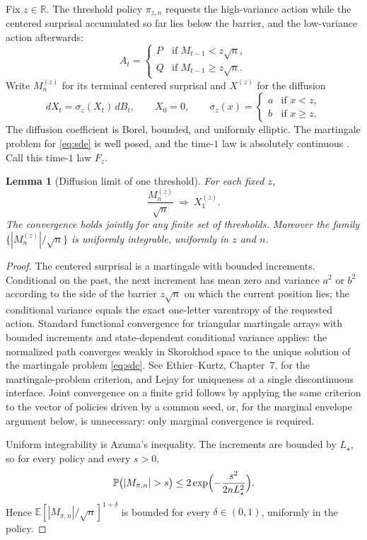 \documentclass[11pt]{article}
\newtheorem{lemma}[theorem]{Lemma}
\theoremstyle{definition}
\newcommand{\E}{\mathbb{E}}
\newcommand{\Prob}{\mathbb{P}}
\newcommand{\R}{\mathbb{R}}
\begin{document}
Fix \(z\in\R\).
The threshold policy \(\pi_{z,n}\) requests the high-variance action while the centered surprisal accumulated so far lies below the barrier, and the low-variance action afterwards:
\[
  A_t=
  \begin{cases}
    P & \text{if }M_{t-1}<z\sqrt{n},\\
    Q & \text{if }M_{t-1}\ge z\sqrt{n}.
  \end{cases}
\]
Write \(M^{(z)}_n\) for its terminal centered surprisal and \(X^{(z)}\) for the diffusion
\begin{equation}
  \label{eq:sde}
  dX_t=\sigma_z(X_t)\,dB_t,
  \qquad
  X_0=0,
  \qquad
  \sigma_z(x)=
  \begin{cases}
    a & \text{if }x<z,\\
    b & \text{if }x\ge z.
  \end{cases}
\end{equation}
The diffusion coefficient is Borel, bounded, and uniformly elliptic.
The martingale problem for \eqref{eq:sde} is well posed, and the time-\(1\) law is absolutely continuous
\cite{Lejay2006,EtoreMartinez}.
Call this time-\(1\) law \(F_z\).

\begin{lemma}[Diffusion limit of one threshold]
\label{lem:fclt}
For each fixed \(z\),
\[
  \frac{M^{(z)}_n}{\sqrt{n}}\ \Rightarrow\ X^{(z)}_1.
\]
The convergence holds jointly for any finite set of thresholds.
Moreover the family \(\{|M^{(z)}_n|/\sqrt{n}\}\) is uniformly integrable, uniformly in \(z\) and \(n\).
\end{lemma}

\begin{proof}
The centered surprisal is a martingale with bounded increments.
Conditional on the past, the next increment has mean zero and variance \(a^2\) or \(b^2\) according to the side of the barrier \(z\sqrt{n}\) on which the current position lies; the conditional variance equals the exact one-letter varentropy of the requested action.
Standard functional convergence for triangular martingale arrays with bounded increments and state-dependent conditional variance applies: the normalized path converges weakly in Skorokhod space to the unique solution of the martingale problem \eqref{eq:sde}.
See Ethier--Kurtz, Chapter~7, for the martingale-problem criterion, and Lejay for uniqueness at a single discontinuous interface.
Joint convergence on a finite grid follows by applying the same criterion to the vector of policies driven by a common seed, or, for the marginal envelope argument below, is unnecessary: only marginal convergence is required.

Uniform integrability is Azuma's inequality.
The increments are bounded by \(L_\star\), so for every policy and every \(s>0\),
\[
  \Prob\bigl(|M_{\pi,n}|>s\bigr)
  \le
  2\exp\Bigl(-\frac{s^2}{2n L_\star^2}\Bigr).
\]
Hence \(\E[|M_{\pi,n}|/\sqrt{n}]^{1+\delta}\) is bounded for every \(\delta\in(0,1)\), uniformly in the policy.
\end{proof}
\end{document}
